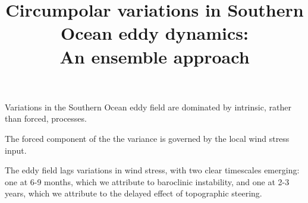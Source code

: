 \documentclass{agujournal2019-navid}
\begin{document}
\justify
\title{Circumpolar variations in Southern Ocean eddy dynamics:\\An ensemble approach}




\begin{keypoints}
\item Variations in the Southern Ocean eddy field are dominated by intrinsic, rather than forced, processes.
\item The forced component of the the variance is governed by the local wind stress input.
\item The eddy field lags variations in wind stress, with two clear timescales emerging: one at 6-9 months, which we attribute to baroclinic instability, and one at 2-3 years, which we attribute to the delayed effect of topographic steering.
\end{keypoints}
\end{document}
